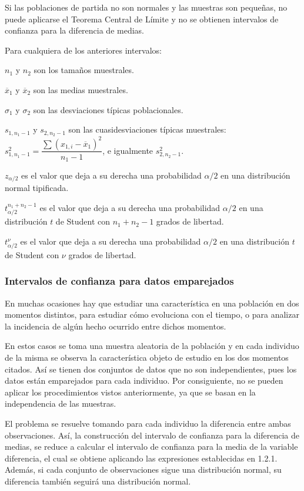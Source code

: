 \documentclass[a4paper]{article}
\begin{document}
Si las poblaciones de partida no son normales y las muestras son
pequeñas, no puede aplicarse el Teorema Central de Límite y no se
obtienen intervalos de confianza para la diferencia de medias.

Para cualquiera de los anteriores intervalos:

$n_{1}$ y $n_{2}$ son los tamaños muestrales.

$\overline{x}_{1}$ y $\overline{x}_{2}$ son las medias muestrales.

$\sigma_{1} $ y $\sigma_{2} $ son las desviaciones típicas
poblacionales.

$s_{1,n_{1}-1}$ y $s_{2,n_{2}-1}$ son las cuasidesviaciones típicas muestrales: $s_{1,n_{1}-1}^{2}=%
\dfrac{\sum \left( x_{1,i}-\overline{x}_{1}\right) ^{2}}{n_{1}-1}
$, e igualmente $s_{2,n_{2}-1}^{2}$.

$z_{\alpha /2}$ es el valor que deja a su derecha una probabilidad
$\alpha /2 $ en una distribución normal tipificada.

$t_{\alpha /2}^{n_{1}+n_{2}-1}$ es el valor que deja a su derecha una probabilidad $%
\alpha /2$ en una distribución $t$ de Student con
$n_{1}+n_{2}-1$ grados de libertad.

$t_{\alpha /2}^{\nu}$ es el valor que deja a su derecha una probabilidad $%
\alpha /2$ en una distribución $t$ de Student con $\nu$ grados
de libertad.

\subsubsection {Intervalos de confianza para datos emparejados}
En muchas ocasiones hay que estudiar una característica en una
población en dos momentos distintos, para estudiar cómo
evoluciona con el tiempo, o para analizar la incidencia de
algún hecho ocurrido entre dichos momentos.

En estos casos se toma una muestra aleatoria de la población y
en cada individuo de la misma se observa la característica
objeto de estudio en los dos momentos citados. Así se tienen
dos conjuntos de datos que no son independientes, pues los datos
están emparejados para cada individuo. Por consiguiente, no se
pueden aplicar los procedimientos vistos anteriormente, ya que se
basan en la independencia de las muestras.

El problema se resuelve tomando para cada individuo la diferencia
entre ambas observaciones. Así, la construcción del
intervalo de confianza para la diferencia de medias, se reduce a
calcular el intervalo de confianza para la media de la variable diferencia, el
cual se obtiene aplicando las expresiones establecidas en 1.2.1.
Además, si cada conjunto de observaciones sigue una
distribución normal, su diferencia también seguirá una
distribución normal.
\end{document}
